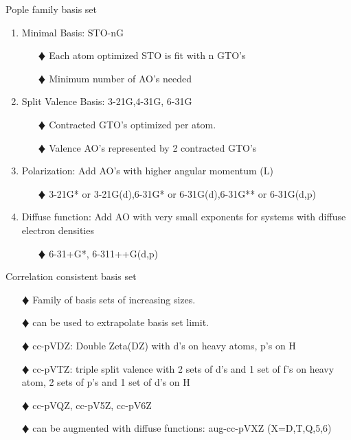 \documentclass[slidestop,mathserif,compress,xcolor=svgnames]{beamer}
\begin{document}
\begin{frame}
{%
\begin{block}{Pople family basis set}
\begin{enumerate}
\item Minimal Basis: STO-nG
\begin{enumerate}
\item[$\vardiamond$]Each atom optimized STO is fit with n GTO's
\item[$\vardiamond$]Minimum number of AO's needed
\end{enumerate}
\item Split Valence Basis: 3-21G,4-31G, 6-31G
\begin{enumerate}
\item[$\vardiamond$]Contracted GTO's optimized per atom.
\item[$\vardiamond$]Valence AO's represented by 2 contracted GTO's
\end{enumerate}
\item Polarization: Add AO's with higher angular momentum (L)
\begin{enumerate}
\item[$\vardiamond$]3-21G* or 3-21G(d),6-31G* or 6-31G(d),6-31G** or 6-31G(d,p)
\end{enumerate}
\item Diffuse function: Add AO with very small exponents for systems with diffuse electron densities
\begin{enumerate}
\item[$\vardiamond$]6-31+G*, 6-311++G(d,p)
\end{enumerate}
\end{enumerate}
\end{block}

\begin{block}{Correlation consistent basis set}
\begin{enumerate}
\item[$\vardiamond$]Family of basis sets of increasing sizes.
\item[$\vardiamond$]can be used to extrapolate basis set limit.
\item[$\vardiamond$]cc-pVDZ: Double Zeta(DZ) with d's on heavy atoms, p's on H
\item[$\vardiamond$]cc-pVTZ: triple split valence with 2 sets of d's and 1 set of f's on heavy atom, 2 sets of p's and 1 set of d's on H
\item[$\vardiamond$]cc-pVQZ, cc-pV5Z, cc-pV6Z
\item[$\vardiamond$]can be augmented with diffuse functions: aug-cc-pVXZ (X=D,T,Q,5,6)
\end{enumerate}
\end{block}

}
\end{frame}
\end{document}

